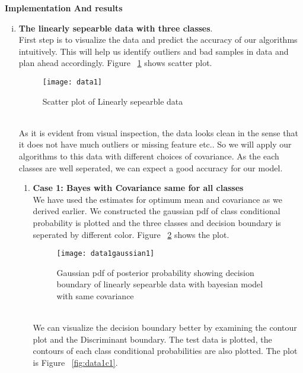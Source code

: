\documentclass[11pt,paper=a4,answers]{exam}
\begin{document}
\begin{questions}
\begin{enumerate}[i.]
    \end{enumerate}
\newpage
\question \textbf{Implementation And results}
\begin{enumerate}[i.]
    \item \textbf{The linearly sepearble data with three classes}.\\
        First step is to visualize the data and predict the accuracy of our algorithms intuitively. This will help us identify outliers and bad samples in data and plan ahead accordingly. Figure ~\ref{fig:scatterData1} shows scatter plot.\\
        \begin{figure}[ht]
            \centering
            \texttt{[image: data1]}
            \vspace{-30pt}
            \caption{Scatter plot of Linearly sepearble data}
            \label{fig:scatterData1}
        \end{figure}\\
        As it is evident from visual inspection, the data looks clean in the sense that it does not have much outliers or missing feature etc.. So we will apply our algorithms to this data with different choices of covariance. As the each classes are well seperated, we can expect a good accuracy for our model.
        \begin{enumerate}
            \item \textbf{Case 1: Bayes with Covariance same for all classes}\\
            We have used the estimates for optimum mean and covariance as we derived earlier. We constructed the gaussian pdf of class conditional probability is plotted and the three classes and decision boundary is seperated by different color. Figure ~\ref{fig:data1g1} shows the plot.
            \begin{figure}[ht]
                \centering
                \texttt{[image: data1gaussian1]}
                \vspace{-30pt}
                \caption{Gaussian pdf of posterior probability showing decision boundary of linearly sepearble data with bayesian model with same covariance}
                \label{fig:data1g1}
            \end{figure}\\
            We can visualize the decision boundary better by examining the contour plot and the Discriminant boundary. The test data is plotted, the contours of each class conditional probabilities are also plotted. The plot is Figure ~\ref{fig:data1c1}.

\end{enumerate}
\end{enumerate}
\end{questions}
\end{document}
